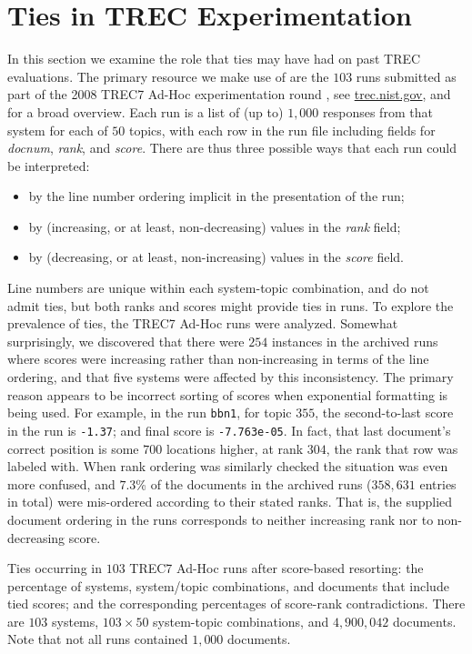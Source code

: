 \section{Ties in TREC Experimentation}
\label{sec-trecimpact}


In this section we examine the role that ties may have had on past
TREC evaluations.
The primary resource we make use of are the $103$ runs submitted as
part of the 2008 TREC7 Ad-Hoc experimentation round
{\citep{vh98trec}}, see {\small\url{trec.nist.gov}}, and
{\citet{harman05trecbook}} for a broad overview.
Each run is a list of (up to) $1{,}000$ responses from that system
for each of $50$ topics, with each row in the run file including
fields for {\emph{docnum}}, {\emph{rank}}, and {\emph{score}}.
There are thus three possible ways that each run could be
interpreted:
\begin{itemize}
\item
by the line number ordering implicit in the presentation of the run;
\item
by (increasing, or at least, non-decreasing) values in the
{\emph{rank}} field;
\item
by (decreasing, or at least, non-increasing) values in the
{\emph{score}} field.
\end{itemize}
Line numbers are unique within each system-topic combination, and do
not admit ties, but both ranks and scores might provide ties in runs.
To explore the prevalence of ties, the TREC7 Ad-Hoc runs were
analyzed.
Somewhat surprisingly, we discovered that there were $254$ instances
in the archived runs where scores were increasing rather than
non-increasing in terms of the line ordering, and that five systems
were affected by this inconsistency.
The primary reason appears to be incorrect sorting of scores when
exponential formatting is being used.
For example, in the run {\tt{bbn1}}, for topic $355$, the
second-to-last score in the run is {\tt{-1.37}}; and final score is
{\tt{-7.763e-05}}.
In fact, that last document's correct position is some $700$
locations higher, at rank $304$, the rank that row was labeled with.
When rank ordering was similarly checked the situation was even more
confused, and $7.3$\% of the documents in the archived runs
($358{,}631$ entries in total) were mis-ordered according to their
stated ranks.
That is, the supplied document ordering in the runs corresponds to
neither increasing rank nor to non-decreasing score.

\begin{table}[t!]
\centering

\renewcommand{\tabcolsep}{0.5em}
\caption{Ties occurring in $103$ TREC7 Ad-Hoc runs after score-based
resorting: the percentage of systems, system/topic combinations, and
documents that include tied scores; and the corresponding percentages
of score-rank contradictions.
There are $103$ systems, $103\times50$ system-topic
combinations, and $4{,}900{,}042$ documents.
Note that not all runs contained $1{,}000$ documents.
\label{tbl-trec7-ties}}
\end{table}

